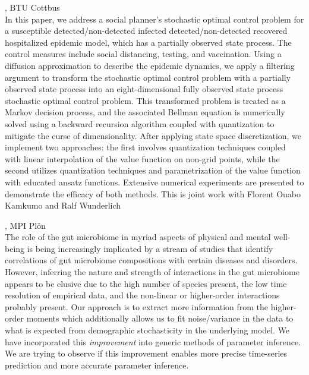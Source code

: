 \documentclass[12pt,a4paper]{article}
\begin{document}
\bigskip\bigskip

, BTU Cottbus \\[2ex] In this paper, we address a social planner’s stochastic optimal control problem for a susceptible detected/non-detected infected detected/non-detected recovered hospitalized epidemic model, which has a partially observed state process. The control measures include social distancing, testing, and vaccination. Using a diffusion approximation to describe the epidemic dynamics, we apply a filtering argument to transform the stochastic optimal control problem with a partially observed state process into an eight-dimensional fully observed state process stochastic optimal control problem. This transformed problem is treated as a Markov decision process, and the associated Bellman equation is numerically solved using a backward recursion algorithm coupled with quantization to mitigate the curse of dimensionality. After applying state space discretization, we implement two approaches: the first involves quantization techniques coupled with linear interpolation of the value function on non-grid points, while the second utilizes quantization techniques and parametrization of the value function with educated ansatz functions. Extensive numerical experiments are presented to demonstrate the efficacy of both methods. This is joint work with Florent Ouabo Kamkumo and Ralf Wunderlich 

\bigskip\bigskip

, MPI Plön \\[2ex] The role of the gut microbiome in myriad aspects of physical and mental well-being is being increasingly implicated by a stream of studies that identify correlations of gut microbiome compositions with certain diseases and disorders. However, inferring the nature and strength of interactions in the gut microbiome appears to be elusive due to the high number of species present, the low time resolution of empirical data, and the non-linear or higher-order interactions probably present. Our approach is to extract more information from the higher-order moments which additionally allows us to fit noise/variance in the data to what is expected from demographic stochasticity in the underlying model. We have incorporated this {\em improvement} into generic methods of parameter inference. We are trying to observe if this improvement enables more precise time-series prediction and more accurate parameter inference. 
\end{document}
